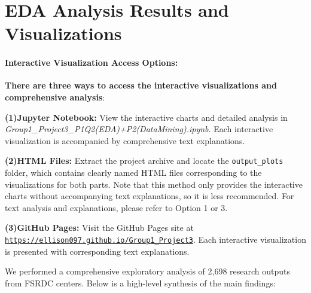 \documentclass[12pt]{article}
\begin{document}
\section{EDA Analysis Results and Visualizations}
\paragraph{\textbf{Interactive Visualization Access Options:}}
\textbf{There are three ways to access the interactive visualizations and comprehensive analysis}:

    \item \textbf{(1)Jupyter Notebook:} View the interactive charts and detailed analysis in \textit{Group1\_Project3\_P1Q2(EDA)+P2(DataMining).ipynb}. Each interactive visualization is accompanied by comprehensive text explanations.
    
    \item \textbf{(2)HTML Files:} Extract the project archive and locate the \texttt{output\_plots} folder, which contains clearly named HTML files corresponding to the visualizations for both parts. Note that this method only provides the interactive charts without accompanying text explanations, so it is less recommended. For text analysis and explanations, please refer to Option 1 or 3.
    
    \item \textbf{(3)GitHub Pages:} Visit the GitHub Pages site at \href{https://ellison097.github.io/Group1_Project3}{\texttt{https://ellison097.github.io/Group1\_Project3}}. Each interactive visualization is presented with corresponding text explanations.

We performed a comprehensive exploratory analysis of 2,698 research outputs from FSRDC centers. Below is a high-level synthesis of the main findings:
\end{document}
